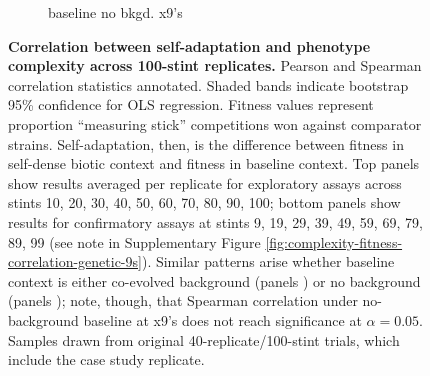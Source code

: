 \begin{figure}
\begin{minipage}{0.5\linewidth}
\begin{subfigure}{0.49\linewidth}
\caption{\footnotesize baseline no bkgd. \@ x9's}
\label{fig:reg-self-adaptation:none-9s}
\end{subfigure}
\end{minipage}%
\begin{minipage}{0.5\linewidth}
\caption{%
\textbf{Correlation between self-adaptation and phenotype complexity across 100-stint replicates.}
\footnotesize
Pearson and Spearman correlation statistics annotated.
Shaded bands indicate bootstrap 95\% confidence for OLS regression.
Fitness values represent proportion ``measuring stick'' competitions won against comparator strains.
Self-adaptation, then, is the difference between fitness in self-dense biotic context and fitness in baseline context.
Top panels show results averaged per replicate for exploratory assays across stints 10, 20, 30, 40, 50, 60, 70, 80, 90, 100; bottom panels show results for confirmatory assays at stints 9, 19, 29, 39, 49, 59, 69, 79, 89, 99 (see note in Supplementary Figure \ref{fig:complexity-fitness-correlation-genetic-9s}).
Similar patterns arise whether baseline context is either co-evolved background (panels ) or no background (panels );
note, though, that Spearman correlation under no-background baseline at x9's does not reach significance at $\alpha = 0.05$.
Samples drawn from original 40-replicate/100-stint trials, which include the case study replicate.
}
\label{fig:reg-self-adaptation}
\end{minipage}

\end{figure}
